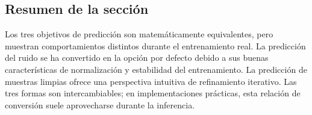 \subsection{Resumen de la sección}

Los tres objetivos de predicción son matemáticamente equivalentes, pero muestran comportamientos distintos durante el entrenamiento real. La predicción del ruido se ha convertido en la opción por defecto debido a sus buenas características de normalización y estabilidad del entrenamiento. La predicción de muestras limpias ofrece una perspectiva intuitiva de refinamiento iterativo. Las tres formas son intercambiables; en implementaciones prácticas, esta relación de conversión suele aprovecharse durante la inferencia.

